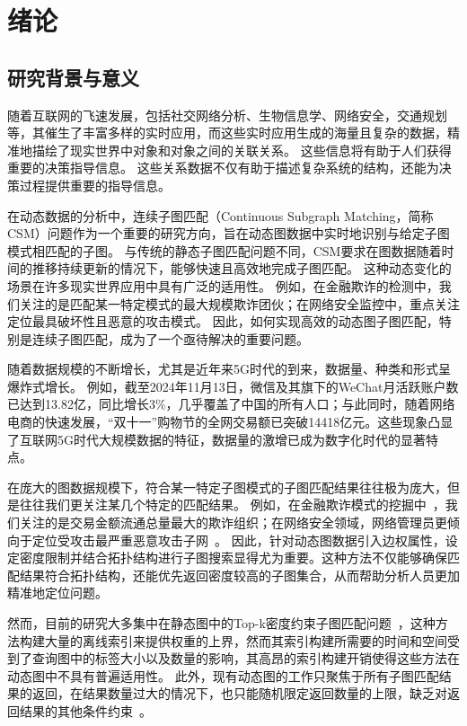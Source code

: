 \chapter{绪论}
\section{研究背景与意义}
随着互联网的飞速发展，包括社交网络分析、生物信息学、网络安全，交通规划等，其催生了丰富多样的实时应用，而这些实时应用生成的海量且复杂的数据，精准地描绘了现实世界中对象和对象之间的关联关系。
这些信息将有助于人们获得重要的决策指导信息。
这些关系数据不仅有助于描述复杂系统的结构，还能为决策过程提供重要的指导信息。


在动态数据的分析中，连续子图匹配（Continuous Subgraph Matching，简称CSM）问题作为一个重要的研究方向，旨在动态图数据中实时地识别与给定子图模式相匹配的子图。
与传统的静态子图匹配问题不同，CSM要求在图数据随着时间的推移持续更新的情况下，能够快速且高效地完成子图匹配。
这种动态变化的场景在许多现实世界应用中具有广泛的适用性。
例如，在金融欺诈的检测中，我们关注的是匹配某一特定模式的最大规模欺诈团伙；在网络安全监控中，重点关注定位最具破坏性且恶意的攻击模式。
因此，如何实现高效的动态图子图匹配，特别是连续子图匹配，成为了一个亟待解决的重要问题。

随着数据规模的不断增长，尤其是近年来5G时代的到来，数据量、种类和形式呈爆炸式增长。
例如，截至2024年11月13日，微信及其旗下的WeChat月活跃账户数已达到13.82亿，同比增长3\%，几乎覆盖了中国的所有人口；与此同时，随着网络电商的快速发展，“双十一”购物节的全网交易额已突破14418亿元。这些现象凸显了互联网5G时代大规模数据的特征，数据量的激增已成为数字化时代的显著特点。

在庞大的图数据规模下，符合某一特定子图模式的子图匹配结果往往极为庞大，但是往往我们更关注某几个特定的匹配结果。
例如，在金融欺诈模式的挖掘中~\cite{csm-cycle-DBLP:journals/pvldb/QiuCQPZLZ18}，我们关注的是交易金额流通总量最大的欺诈组织；在网络安全领域，网络管理员更倾向于定位受攻击最严重恶意攻击子网~\cite{traffic-graph-matching-DBLP:journals/pvldb/SongGCW14}。
因此，针对动态图数据引入边权属性，设定密度限制并结合拓扑结构进行子图搜索显得尤为重要。这种方法不仅能够确保匹配结果符合拓扑结构，还能优先返回密度较高的子图集合，从而帮助分析人员更加精准地定位问题。

然而，目前的研究大多集中在静态图中的Top-k密度约束子图匹配问题~\cite{density-define-DBLP:journals/vldb/AngelKSSST14,dsm-noweight-Bahmani-DBLP:journals/pvldb/BahmaniKV12}，这种方法构建大量的离线索引来提供权重的上界，然而其索引构建所需要的时间和空间受到了查询图中的标签大小以及数量的影响，其高昂的索引构建开销使得这些方法在动态图中不具有普遍适用性。
此外，现有动态图的工作只聚焦于所有子图匹配结果的返回，在结果数量过大的情况下，也只能随机限定返回数量的上限，缺乏对返回结果的其他条件约束~\cite{csm-sjtree-DBLP:conf/edbt/ChoudhuryHCAF15,csm-IncIsoMatch-DBLP:conf/sigmod/FanLLTWW11,dsm-noweight-Hu-DBLP:conf/cikm/HuWC17,csm-turboflux-DBLP:conf/sigmod/KimSHLHCSJ18,csm-graphflowpp-DBLP:journals/tods/MhedhbiKS21,csm-symbi-DBLP:journals/pvldb/MinPPGIH21,csm-rapidflow-DBLP:journals/pvldb/SunSHL22}。


